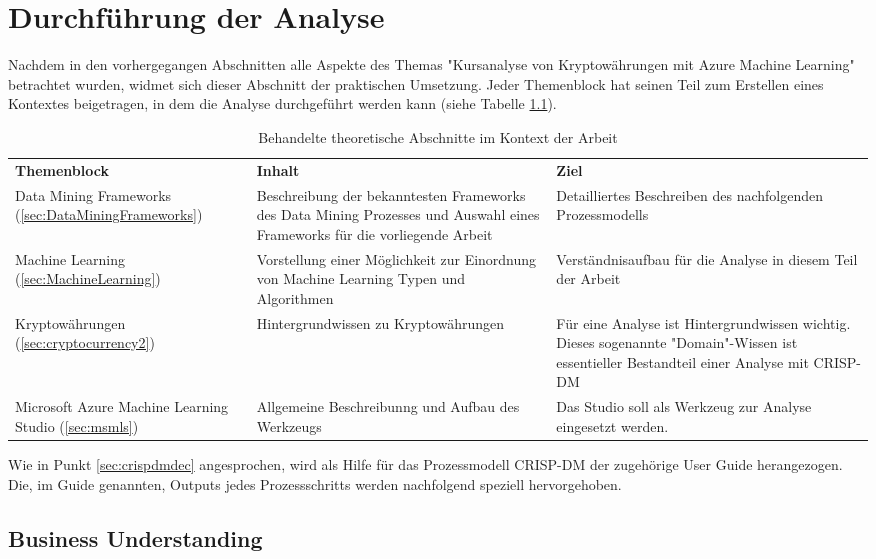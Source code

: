 \chapter{Durchführung der Analyse}
Nachdem in den vorhergegangen Abschnitten alle Aspekte des Themas "Kursanalyse von Kryptowährungen mit Azure Machine Learning" betrachtet wurden, widmet sich dieser Abschnitt der praktischen Umsetzung. Jeder Themenblock hat seinen Teil zum Erstellen eines Kontextes beigetragen, in dem die Analyse durchgeführt werden kann (siehe Tabelle \ref{tab:themeblocks}).
\begin{table}[H]
\begin{tabular}{|p{}|p{6cm}|p{7cm}|}
\hline
\textbf{Themenblock} & \textbf{Inhalt} & \textbf{Ziel}\\ 
\hhline{===}
Data Mining Frameworks (\ref{sec:DataMiningFrameworks}) & Beschreibung der bekanntesten Frameworks des Data Mining Prozesses und Auswahl eines Frameworks für die vorliegende Arbeit & Detailliertes Beschreiben des nachfolgenden Prozessmodells\\
\hline
Machine Learning (\ref{sec:MachineLearning}) & Vorstellung einer Möglichkeit zur Einordnung von Machine Learning Typen und Algorithmen & Verständnisaufbau für die Analyse in diesem Teil der Arbeit\\
\hline
Kryptowährungen (\ref{sec:cryptocurrency2}) & Hintergrundwissen zu Kryptowährungen & Für eine Analyse ist Hintergrundwissen wichtig. Dieses sogenannte "Domain"-Wissen ist essentieller Bestandteil einer Analyse mit CRISP-DM\\
\hline
Microsoft Azure Machine Learning Studio (\ref{sec:msmls}) & Allgemeine Beschreibunng und Aufbau des Werkzeugs & Das Studio soll als Werkzeug zur Analyse eingesetzt werden.\\
\hline
\end{tabular}
\caption{Behandelte theoretische Abschnitte im Kontext der Arbeit}
\label{tab:themeblocks}
\end{table}
Wie in Punkt \ref{sec:crispdmdec} angesprochen, wird als Hilfe für das Prozessmodell CRISP-DM der zugehörige User Guide \citep[S.~30-56]{chapman_crisp-dm_2000} herangezogen. Die, im Guide genannten, Outputs jedes Prozessschritts werden nachfolgend speziell hervorgehoben.
 
\section{Business Understanding}
